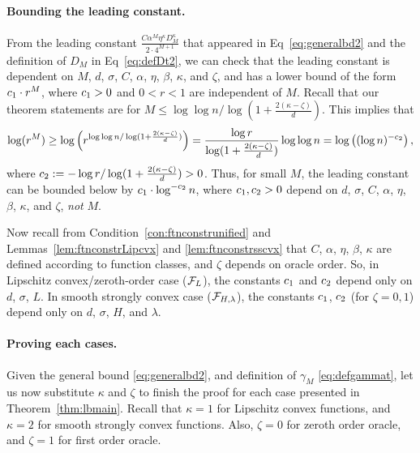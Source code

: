 \paragraph{Bounding the leading constant.}
From the leading constant $\frac{C\alpha^M \eta^\kappa D_M^\kappa}{2 \cdot 4^{M+1}}$ that appeared in Eq~\eqref{eq:generalbd2} 
and the definition of $D_M$ in Eq~\eqref{eq:defDt2},
we can check that the leading constant is dependent on
$M$, $d$, $\sigma$, $C$, $\alpha$, $\eta$, $\beta$, $\kappa$, and $\zeta$,
and has a lower bound of the form $c_1 \cdot r^M$, where $c_1 > 0$ and $0 < r < 1$ are independent of $M$.
Recall that our theorem statements are for $M \leq \log\log n/\log(1+\frac{2(\kappa-\zeta)}{d})$. This implies that
\begin{equation*}
\log(r^M) \geq \log \left (r^{\log\log n/\log(1+\frac{2(\kappa-\zeta)}{d})} \right ) = \frac{\log r}{\log (1+\frac{2(\kappa-\zeta)}{d})} \log \log n = \log \left( (\log n)^{-c_2} \right ),
\end{equation*}
where $c_2 := - \log r / \log (1+\frac{2(\kappa-\zeta)}{d}) > 0$. Thus, for small $M$,
the leading constant can be bounded below by $c_1 \cdot \log^{-c_2} n$, where $c_1, c_2>0$ depend on 
$d$, $\sigma$, $C$, $\alpha$, $\eta$, $\beta$, $\kappa$, and $\zeta$, \emph{not} $M$.

Now recall from Condition~\ref{con:ftnconstrunified} and Lemmas~\ref{lem:ftnconstrLipcvx} and \ref{lem:ftnconstrsscvx} that 
$C$, $\alpha$, $\eta$, $\beta$, $\kappa$ are defined according to function classes, 
and $\zeta$ depends on oracle order.
So, in Lipschitz convex/zeroth-order case ($\mathcal{F}_{L}$), the constants $c_1$ and $c_2$ depend only on $d$, $\sigma$, $L$. In smooth strongly convex case ($\mathcal{F}_{H,\lambda}$), the constants $c_1$, $c_2$ (for $\zeta = 0,1$) depend only on $d$, $\sigma$, $H$, and $\lambda$.

\paragraph{Proving each cases.}
Given the general bound \eqref{eq:generalbd2}, and definition of $\gamma_{M}$ \eqref{eq:defgammat}, let us now substitute $\kappa$ and $\zeta$ to finish the proof for each case presented in Theorem~\ref{thm:lbmain}.
Recall that $\kappa = 1$ for Lipschitz convex functions, and $\kappa = 2$ for smooth strongly convex functions.
Also, $\zeta = 0$ for zeroth order oracle, and $\zeta = 1$ for first order oracle.

